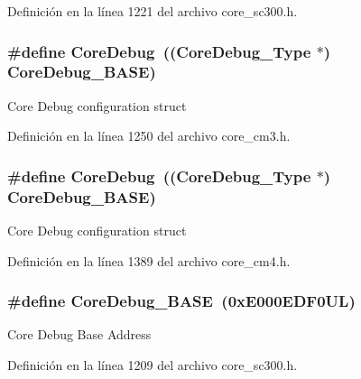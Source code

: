 Definición en la línea 1221 del archivo core\+\_\+sc300.\+h.

\subsubsection[{\texorpdfstring{Core\+Debug}{CoreDebug}}]{\setlength{\rightskip}{0pt plus 5cm}\#define Core\+Debug~(({\bf Core\+Debug\+\_\+\+Type} $\ast$)     {\bf Core\+Debug\+\_\+\+B\+A\+SE})}\hypertarget{group___c_m_s_i_s__core__base_gab6e30a2b802d9021619dbb0be7f5d63d}{}\label{group___c_m_s_i_s__core__base_gab6e30a2b802d9021619dbb0be7f5d63d}
Core Debug configuration struct 

Definición en la línea 1250 del archivo core\+\_\+cm3.\+h.

\subsubsection[{\texorpdfstring{Core\+Debug}{CoreDebug}}]{\setlength{\rightskip}{0pt plus 5cm}\#define Core\+Debug~(({\bf Core\+Debug\+\_\+\+Type} $\ast$)     {\bf Core\+Debug\+\_\+\+B\+A\+SE})}\hypertarget{group___c_m_s_i_s__core__base_gab6e30a2b802d9021619dbb0be7f5d63d}{}\label{group___c_m_s_i_s__core__base_gab6e30a2b802d9021619dbb0be7f5d63d}
Core Debug configuration struct 

Definición en la línea 1389 del archivo core\+\_\+cm4.\+h.

\subsubsection[{\texorpdfstring{Core\+Debug\+\_\+\+B\+A\+SE}{CoreDebug_BASE}}]{\setlength{\rightskip}{0pt plus 5cm}\#define Core\+Debug\+\_\+\+B\+A\+SE~(0x\+E000\+E\+D\+F0\+U\+L)}\hypertarget{group___c_m_s_i_s__core__base_ga680604dbcda9e9b31a1639fcffe5230b}{}\label{group___c_m_s_i_s__core__base_ga680604dbcda9e9b31a1639fcffe5230b}
Core Debug Base Address 

Definición en la línea 1209 del archivo core\+\_\+sc300.\+h.

